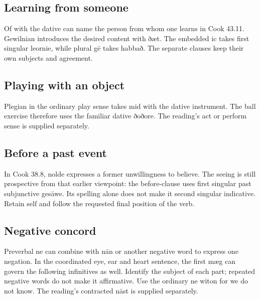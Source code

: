\subsection*{Learning from someone}

Of with the dative can name the person from whom one learns in Cook 43.11. Gewilnian introduces the desired content with ðæt. The embedded ic takes first singular leornie, while plural gē takes habbað. The separate clauses keep their own subjects and agreement.

\subsection*{Playing with an object}

Plegian in the ordinary play sense takes mid with the dative instrument. The ball exercise therefore uses the familiar dative ðoðore. The reading’s act or perform sense is supplied separately.

\subsection*{Before a past event}

In Cook 38.8, nolde expresses a former unwillingness to believe. The seeing is still prospective from that earlier viewpoint: the before-clause uses first singular past subjunctive gesāwe. Its spelling alone does not make it second singular indicative. Retain self and follow the requested final position of the verb.

\subsection*{Negative concord}

Preverbal ne can combine with nān or another negative word to express one negation. In the coordinated eye, ear and heart sentence, the first mæg can govern the following infinitives as well. Identify the subject of each part; repeated negative words do not make it affirmative. Use the ordinary ne witon for we do not know. The reading’s contracted nāst is supplied separately.


